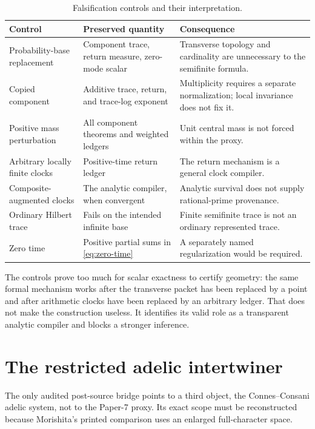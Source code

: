 \documentclass[11pt,a4paper]{article}
\theoremstyle{definition}
\begin{document}
\begin{table}[htbp]
\centering
\caption{Falsification controls and their interpretation.}
\label{tab:controls}
\small
\begin{tabularx}{\textwidth}{@{}p{}p{}X@{}}
\toprule
Control & Preserved quantity & Consequence \\
\midrule
Probability-base replacement & Component trace, return measure,
zero-mode scalar & Transverse topology and cardinality are unnecessary to the
semifinite formula. \\
Copied component & Additive trace, return, and trace-log exponent & Multiplicity
requires a separate normalization; local invariance does not fix it. \\
Positive mass perturbation & All component theorems and weighted ledgers &
Unit central mass is not forced within the proxy. \\
Arbitrary locally finite clocks & Positive-time return ledger & The return
mechanism is a general clock compiler. \\
Composite-augmented clocks & The analytic compiler, when convergent & Analytic
survival does not supply rational-prime provenance. \\
Ordinary Hilbert trace & Fails on the intended infinite base & Finite
semifinite trace is not an ordinary represented trace. \\
Zero time & Positive partial sums in \eqref{eq:zero-time} & A separately named
regularization would be required. \\
\bottomrule
\end{tabularx}
\end{table}

The controls prove too much for scalar exactness to certify geometry: the same
formal mechanism works after the transverse packet has been replaced by a
point and after arithmetic clocks have been replaced by an arbitrary ledger.
That does not make the construction useless.  It identifies its valid role as
a transparent analytic compiler and blocks a stronger inference.

\section{The restricted adelic intertwiner}
\label{sec:morishita}

The only audited post-source bridge points to a third object, the
Connes--Consani adelic system, not to the Paper-7 proxy.  Its exact scope must
be reconstructed because Morishita's printed comparison uses an enlarged
full-character space.
\end{document}
